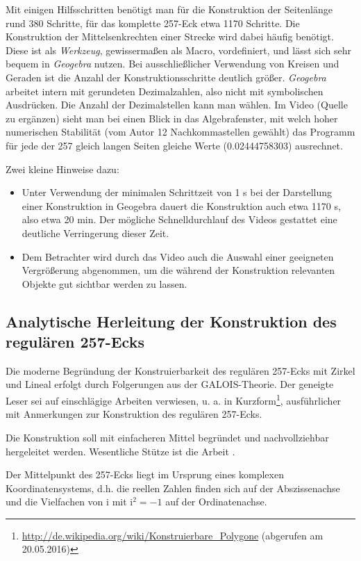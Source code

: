 \documentclass[11pt]{article}
\newcommand{\ii}{\mathrm{i}}
\begin{document}
Mit einigen Hilfsschritten benötigt man für die Konstruktion der Seitenlänge
rund 380 Schritte, für das komplette 257-Eck etwa 1170 Schritte. Die
Konstruktion der Mittelsenkrechten einer Strecke wird dabei häufig benötigt.
Diese ist als \emph{Werkzeug}, gewissermaßen als Macro, vordefiniert, und
lässt sich sehr bequem in \emph{Geogebra} nutzen. Bei ausschließlicher
Verwendung von Kreisen und Geraden ist die Anzahl der Konstruktionsschritte
deutlich größer. \emph{Geogebra} arbeitet intern mit gerundeten Dezimalzahlen,
also nicht mit symbolischen Ausdrücken. Die Anzahl der Dezimalstellen kann man
wählen. Im Video (Quelle zu ergänzen) sieht man bei einen Blick in das
Algebrafenster, mit welch hoher numerischen Stabilität (vom Autor 12
Nachkommastellen gewählt) das Programm für jede der 257 gleich langen Seiten
gleiche Werte (0.02444758303) ausrechnet.

Zwei kleine Hinweise dazu:
\begin{itemize}[noitemsep]
\item Unter Verwendung der minimalen Schrittzeit von 1 s bei der Darstellung
  einer Konstruktion in Geogebra dauert die Konstruktion auch etwa 1170 s,
  also etwa 20 min. Der mögliche Schnelldurchlauf des Videos gestattet eine
  deutliche Verringerung dieser Zeit.
\item Dem Betrachter wird durch das Video auch die Auswahl einer geeigneten
  Vergrößerung abgenommen, um die während der Konstruktion relevanten Objekte
  gut sichtbar werden zu lassen.
\end{itemize}

\subsection*{Analytische Herleitung der Konstruktion des regulären 257-Ecks}

Die moderne Begründung der Konstruierbarkeit des regulären 257-Ecks mit Zirkel
und Lineal erfolgt durch Folgerungen aus der GALOIS-Theorie. Der geneigte
Leser sei auf einschlägige Arbeiten verwiesen, u. a. in
Kurzform\footnote{\url{http://de.wikipedia.org/wiki/Konstruierbare_Polygone}
  (abgerufen am 20.05.2016)}, ausführlicher \cite{Bishop1978} mit Anmerkungen
zur Konstruktion des regulären 257-Ecks.

Die Konstruktion soll mit einfacheren Mittel begründet und nachvollziehbar
hergeleitet werden. Wesentliche Stütze ist die Arbeit \cite{deTemple1991}.

Der Mittelpunkt des 257-Ecks liegt im Ursprung eines komplexen
Koordinatensystems, d.h. die reellen Zahlen finden sich auf der Abszissenachse
und die Vielfachen von $\ii$ mit $\ii^{2}=-1$ auf der Ordinatenachse.
\end{document}

